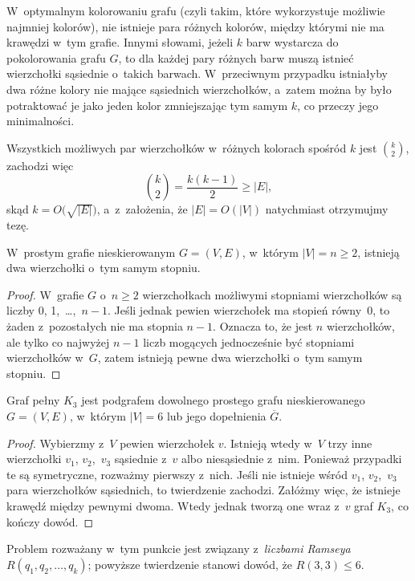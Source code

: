 \subproblem %
W~optymalnym kolorowaniu grafu (czyli takim, które wykorzystuje możliwie najmniej kolorów), nie istnieje para różnych kolorów, między którymi nie ma krawędzi w~tym grafie. Innymi słowami, jeżeli $k$ barw wystarcza do pokolorowania grafu $G$, to dla każdej pary różnych barw muszą istnieć wierzchołki sąsiednie o~takich barwach. W~przeciwnym przypadku istniałyby dwa różne kolory nie mające sąsiednich wierzchołków, a~zatem można by było potraktować je jako jeden kolor zmniejszając tym samym $k$, co przeczy jego minimalności.

Wszystkich możliwych par wierzchołków w~różnych kolorach spośród $k$ jest $\binom{k}{2}$, zachodzi więc
\[
	\binom{k}{2} = \frac{k(k-1)}{2} \ge |E|,
\]
skąd $k=O\bigl(\!\sqrt{|E|}\bigr)$, a~z~założenia, że $|E|=O(|V|)$ natychmiast otrzymujmy tezę.

\subproblem %
\begin{twierdzenie}
	W~prostym grafie nieskierowanym $G=(V,E)$, w~którym $|V|=n\ge2$, istnieją dwa wierzchołki o~tym samym stopniu.
\end{twierdzenie}
\begin{proof}
W~grafie $G$ o~$n\ge2$ wierzchołkach możliwymi stopniami wierzchołków są liczby 0, 1,~\dots,~$n-1$. Jeśli jednak pewien wierzchołek ma stopień równy~0, to żaden z~pozostałych nie ma stopnia $n-1$. Oznacza to, że jest $n$ wierzchołków, ale tylko co najwyżej $n-1$ liczb mogących jednocześnie być stopniami wierzchołków w~$G$, zatem istnieją pewne dwa wierzchołki o~tym samym stopniu.
\end{proof}

\subproblem %
\begin{twierdzenie}
	Graf pełny $K_3$ jest podgrafem dowolnego prostego grafu nieskierowanego $G=(V,E)$, w~którym $|V|=6$ lub jego dopełnienia $\overline{G}$.
\end{twierdzenie}
\begin{proof}
Wybierzmy z~$V$ pewien wierzchołek $v$. Istnieją wtedy w~$V$ trzy inne wierzchołki $v_1$, $v_2$,~$v_3$ sąsiednie z~$v$ albo niesąsiednie z~nim. Ponieważ przypadki te są symetryczne, rozważmy pierwszy z~nich. Jeśli nie istnieje wśród $v_1$, $v_2$,~$v_3$ para wierzchołków sąsiednich, to twierdzenie zachodzi. Załóżmy więc, że istnieje krawędź między pewnymi dwoma. Wtedy jednak tworzą one wraz z~$v$ graf $K_3$, co kończy dowód.
\end{proof}

Problem rozważany w~tym punkcie jest związany z~\emph{liczbami Ramseya} $R(q_1,q_2,\dots,q_k)$; powyższe twierdzenie stanowi dowód, że $R(3,3)\le6$.

